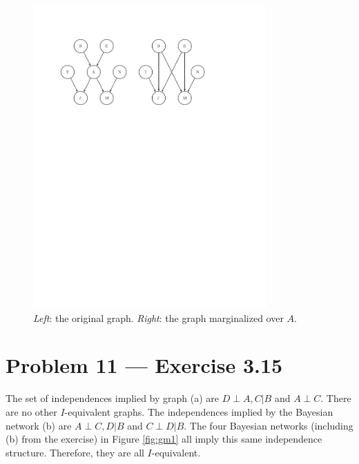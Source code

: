 \documentclass[11pt]{article}
\newcommand{\fig}[1]{Figure \ref{fig:#1}}
\newcommand{\figlabel}[1]{\label{fig:#1}}
\begin{document}
\begin{figure}[hbtp]
    \centering
    \includegraphics[width=0.8\textwidth,%
        trim=1.9cm 18cm 4.8cm 3cm,clip=true]{gm/gm3.pdf}
    \caption{\emph{Left}: the original graph. \emph{Right}: the graph
        marginalized over $A$.\figlabel{gm3}}
\end{figure}

\section{Problem 11 --- Exercise 3.15}

The set of independences implied by graph (a) are $D \perp A,C | B$ and
$A \perp C$. There are no other $I$-equivalent graphs.
The independences implied by the Bayesian network (b) are $A \perp C,D|B$ and
$C \perp D | B$.  The four Bayesian networks (including (b) from the exercise)
in \fig{gm1} all imply this same independence structure. Therefore, they
are all $I$-equivalent.
\end{document}
